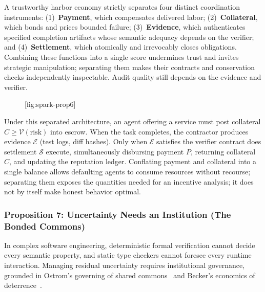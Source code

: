 \documentclass[11pt,a4paper]{article}
\providecommand{\pdchapref}[2]{\textbf{#2}}
\begin{document}
A trustworthy harbor economy strictly separates four distinct coordination instruments: (1)~\textbf{Payment}, which compensates delivered labor; (2)~\textbf{Collateral}, which bonds and prices bounded failure; (3)~\textbf{Evidence}, which authenticates specified completion artifacts whose semantic adequacy depends on the verifier; and (4)~\textbf{Settlement}, which atomically and irrevocably closes obligations. Combining these functions into a single score undermines trust and invites strategic manipulation; separating them makes their contracts and conservation checks independently inspectable. Audit quality still depends on the evidence and verifier.

\begin{figure}[tp]
  \centering
  [fig:spark-prop6]
\end{figure}

Under this separated architecture, an agent offering a service must post collateral $C \ge \mathcal{V}(\text{risk})$ into escrow. When the task completes, the contractor produces evidence $\mathcal{E}$ (test logs, diff hashes). Only when $\mathcal{E}$ satisfies the verifier contract does settlement $\mathcal{S}$ execute, simultaneously disbursing payment $P$, returning collateral $C$, and updating the reputation ledger. Conflating payment and collateral into a single balance allows defaulting agents to consume resources without recourse; separating them exposes the quantities needed for an incentive analysis; it does not by itself make honest behavior optimal.

\subsubsection*{Proposition 7: Uncertainty Needs an Institution (\pdchapref{bonded}{The Bonded Commons})}
In complex software engineering, deterministic formal verification cannot decide every semantic property, and static type checkers cannot foresee every runtime interaction. Managing residual uncertainty requires institutional governance, grounded in Ostrom's governing of shared commons~ and Becker's economics of deterrence~.
\end{document}
